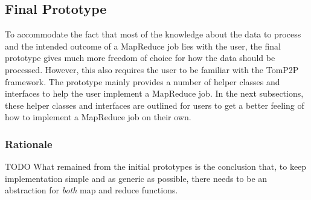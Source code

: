 \subsection{Final Prototype}
To accommodate the fact that most of the knowledge about the data to process and the intended outcome of a MapReduce job lies with the user, the final prototype gives much more freedom of choice for how the data should be processed. However, this also requires the user to be familiar with the TomP2P framework. The prototype mainly provides a number of helper classes and interfaces to help the user implement a MapReduce job. In the next subsections, these helper classes and interfaces are outlined for users to get a better feeling of how to implement a MapReduce job on their own.

\subsubsection{Rationale}
TODO\newline
What remained from the initial prototypes is the conclusion that, to keep implementation simple and as generic as possible, there needs to be an abstraction for \textit{both} map and reduce functions.

